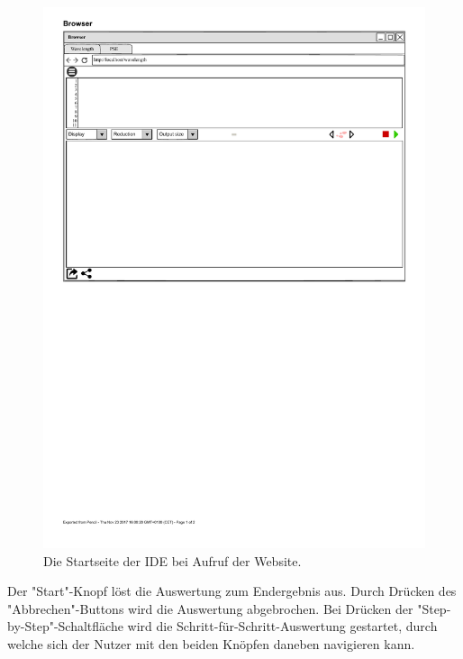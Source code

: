 \documentclass[parskip=full,11pt,twoside]{scrartcl}
\begin{document}
\begin{figure}[H]
	\centering
	\includegraphics[width = \textwidth]{img/startseite}
	\caption{Die Startseite der IDE bei Aufruf der Website.} 
	\label{img:start}
\end{figure}


Der "Start"-Knopf löst die Auswertung zum Endergebnis aus. Durch Drücken des "Abbrechen"-Buttons wird die Auswertung abgebrochen. Bei Drücken der "Step-by-Step"-Schaltfläche wird die Schritt-für-Schritt-Auswertung gestartet, durch welche sich der Nutzer mit den beiden Knöpfen daneben navigieren kann.
\end{document}
